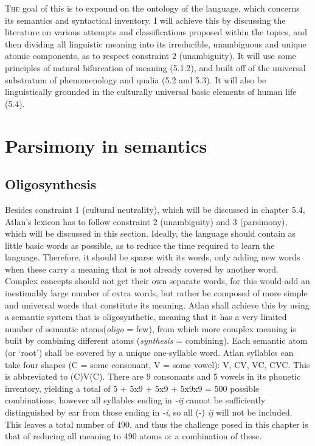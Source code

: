 
\lettrine{T}{he} goal of this is to expound on the ontology of the language, which concerns its semantics and syntactical inventory. I will achieve this by discussing the literature on various attempts and classifications proposed within the topics, and then dividing all linguistic meaning into its irreducible, unambiguous and unique atomic components, as to respect constraint 2 (unambiguity). It will use some principles of natural bifurcation of meaning (5.1.2), and built off of the universal substratum of phenomenology and qualia (5.2 and 5.3). It will also be linguistically grounded in the culturally universal basic elements of human life (5.4).


\section{Parsimony in semantics}

\subsection{Oligosynthesis}


Besides constraint 1 (cultural neutrality), which will be discussed in chapter 5.4, Atlan’s lexicon has to follow constraint 2 (unambiguity) and 3 (parsimony), which will be discussed in this section. Ideally, the language should contain as little basic words as possible, as to reduce the time required to learn the language. Therefore, it should be sparse with its words, only adding new words when these carry a meaning that is not already covered by another word. Complex concepts should not get their own separate words, for this would add an inestimably large number of extra words, but rather be composed of more simple and universal words that constitute its meaning. Atlan shall achieve this by using a semantic system that is oligosynthetic, meaning that it has a very limited number of semantic atoms\footnotemark (\textit{oligo}  = few), from which more complex meaning is built by combining different atoms (\textit{synthesis}  = combining). Each semantic atom (or ‘root’) shall be covered by a unique one-syllable word. Atlan syllables can take four shapes (C = some consonant, V = some vowel): V, CV, VC, CVC. This is abbreviated to (C)V(C). There are 9 consonants and 5 vowels in its phonetic inventory, yielding a total of 5 + 5x9 + 5x9 + 5x9x9 = 500 possible combinations, however all syllables ending in \textit{-ij} cannot be sufficiently distinguished by ear from those ending in \textit{-i}, so all (-) \textit{ij} will not be included. This leaves a total number of 490, and thus the challenge posed in this chapter is that of reducing all meaning to 490 atoms or a combination of these.  

